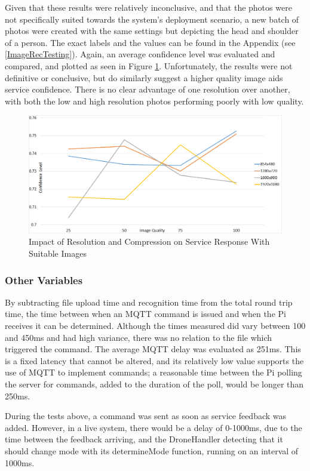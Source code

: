 \documentclass{article}
\begin{document}
Given that these results were relatively inconclusive, and that the photos were not specifically suited towards the system's deployment scenario, a new batch of photos were created with the same settings but depicting the head and shoulder of a person. The exact labels and the values can be found in the Appendix (see \ref{ImageRecTesting}). Again, an average confidence level was evaluated and compared, and plotted as seen in Figure \ref{fig:ImageResImpactOnPerson}. Unfortunately, the results were not definitive or conclusive, but do similarly suggest a higher quality image aids service confidence. There is no clear advantage of one resolution over another, with both the low and high resolution photos performing poorly with low quality.

\begin{figure}[h]
\centering
\caption{Impact of Resolution and Compression on Service Response With Suitable Images\label{fig:ImageResImpactOnPerson}}
\includegraphics[width=\textwidth]{ImageResImpactOnPerson}
\end{figure}

\subsubsection{Other Variables}
By subtracting file upload time and recognition time from the total round trip time, the time between when an MQTT command is issued and when the Pi receives it can be determined. Although the times measured did vary between 100 and 450ms and had high variance, there was no relation to the file which triggered the command. The average MQTT delay was evaluated as 251ms. This is a fixed latency that cannot be altered, and its relatively low value supports the use of MQTT to implement commands; a reasonable time between the Pi polling the server for commands, added to the duration of the poll, would be longer than 250ms. 

During the tests above, a command was sent as soon as service feedback was added. However, in a live system, there would be a delay of 0-1000ms, due to the time between the feedback arriving, and the DroneHandler detecting that it should change mode with its determineMode function, running on an interval of 1000ms. 
\end{document}
